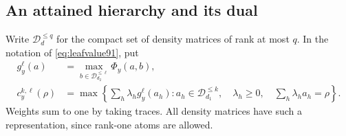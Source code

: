 \subsection{An attained hierarchy and its dual}
Write $\mathcal D_d^{\le q}$ for the compact set of density matrices of
rank at most $q$.  In the notation of \eqref{eq:leafvalue91}, put
\begin{align}
 g_y^\ell(a)&=\max_{b\in\mathcal D_{d_2}^{\le\ell}}\Phi_y(a,b),
 \label{eq:rankleaf92}\\
 c_y^{k,\ell}(\rho)&=\max\left\{\sum_h\lambda_hg_y^\ell(a_h):
 a_h\in\mathcal D_{d_1}^{\le k},\quad
 \lambda_h\ge0,\quad\sum_h\lambda_ha_h=\rho\right\}.
 \label{eq:rankroof92}
\end{align}
Weights sum to one by taking traces.  All density matrices have such a
representation, since rank-one atoms are allowed.

